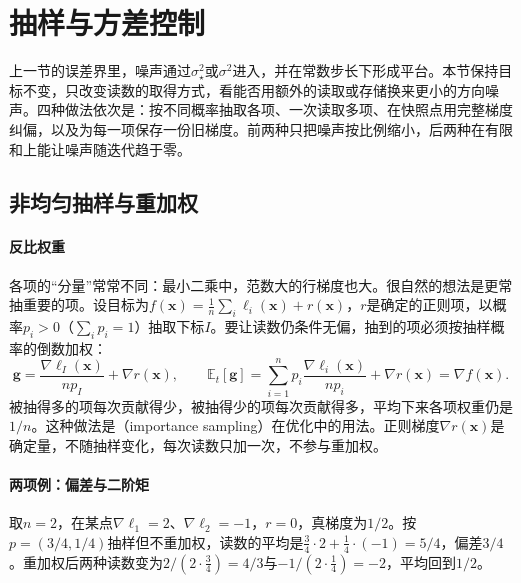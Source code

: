 \section{抽样与方差控制}
\label{sec:opt-sto-variance}

上一节的误差界里，噪声通过$\sigma_\star^2$或$\sigma^2$进入，并在常数步长下形成平台。本节保持目标不变，只改变读数的取得方式，看能否用额外的读取或存储换来更小的方向噪声。四种做法依次是：按不同概率抽取各项、一次读取多项、在快照点用完整梯度纠偏，以及为每一项保存一份旧梯度。前两种只把噪声按比例缩小，后两种在有限和上能让噪声随迭代趋于零。

\subsection{非均匀抽样与重加权}
\label{sec:opt-sto-importance}

\paragraph{反比权重}
各项的“分量”常常不同：最小二乘中，范数大的行梯度也大。很自然的想法是更常抽重要的项。设目标为$f(\bm x)=\frac1n\sum_i\ell_i(\bm x)+r(\bm x)$，$r$是确定的正则项，以概率$p_i>0$（$\sum_ip_i=1$）抽取下标$I$。要让读数仍条件无偏，抽到的项必须按抽样概率的倒数加权：
\begin{equation}
\label{eq:opt-sto-importance}
  \bm g=\frac{\nabla\ell_I(\bm x)}{np_I}+\nabla r(\bm x),\qquad
  \mathbb E_t[\bm g]=\sum_{i=1}^np_i\frac{\nabla\ell_i(\bm x)}{np_i}+\nabla r(\bm x)=\nabla f(\bm x).
\end{equation}
被抽得多的项每次贡献得少，被抽得少的项每次贡献得多，平均下来各项权重仍是$1/n$。这种做法是（importance sampling）在优化中的用法。正则梯度$\nabla r(\bm x)$是确定量，不随抽样变化，每次读数只加一次，不参与重加权。

\paragraph{两项例：偏差与二阶矩}
取$n=2$，在某点$\nabla\ell_1=2$、$\nabla\ell_2=-1$，$r=0$，真梯度为$1/2$。按$p=(3/4,1/4)$抽样但不重加权，读数的平均是$\tfrac34\cdot2+\tfrac14\cdot(-1)=5/4$，偏差$3/4$。重加权后两种读数变为$2/(2\cdot\tfrac34)=4/3$与$-1/(2\cdot\tfrac14)=-2$，平均回到$1/2$。

